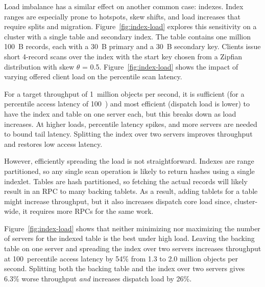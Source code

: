 Load imbalance has a similar effect on another common case: indexes.
Index ranges are especially prone to hotspots, skew shifts, and load increases
that require splits and migration.
%
Figure~\ref{fig:index-load} explores this sensitivity on a cluster with a single
table and secondary index.  The table contains one million 100~B
records, each
with a 30~B primary and a 30~B secondary key. Clients issue short 4-record scans over
the index with the start key chosen from a Zipfian distribution with skew
$\theta$ = 0.5.
Figure~\ref{fig:index-load} shows the impact of varying offered client load on
the \nnnth percentile scan latency.

For a target throughput of 1~million objects per second, it is sufficient
(for a \nnnth percentile access latency of 100~\us) and
most efficient (dispatch load is lower) to have the index and table on one server each, but this breaks
down as load increases. At higher loads, \nnnth percentile latency
spikes, and
more servers are needed to bound tail latency. Splitting the index over two
servers improves throughput and restores low access latency.

However, efficiently spreading the load is not straightforward.  Indexes are
range partitioned, so any single scan operation is likely to return hashes using a single
indexlet.  Tables are hash partitioned, so fetching the actual records will
likely result in an RPC to many backing tablets.  As a result, adding tablets for a table
might increase throughput, but it also increases dispatch core load since, cluster-wide,
it requires more RPCs for the same work.

Figure~\ref{fig:index-load} shows that neither minimizing nor maximizing the
number of servers for the indexed table is the best under high load. Leaving the
backing table on one server and spreading the index over two servers increases
throughput at 100~\us \nnnth percentile access latency by 54\% from 1.3 to 2.0
million objects per second. Splitting both the backing table and the index over two
servers gives 6.3\% worse throughput {\em and} increases dispatch load by 26\%.

